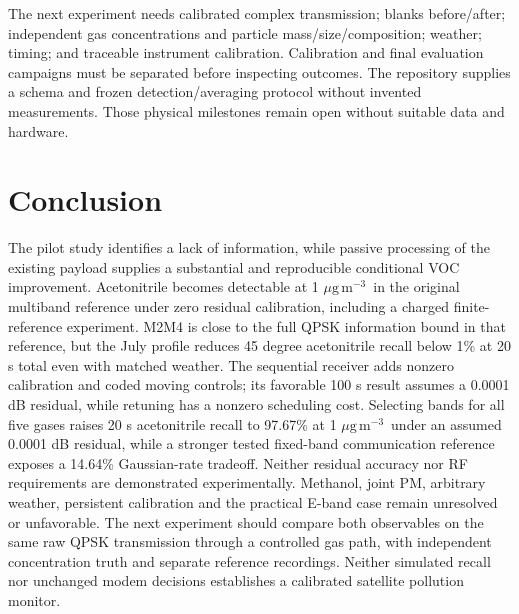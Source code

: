 \documentclass[conference]{IEEEtran}
\newcommand{\ugm}{\ensuremath{\mu\mathrm{g\,m}^{-3}}}
\begin{document}
The next experiment needs calibrated complex transmission; blanks before/after; independent gas concentrations and particle mass/size/composition; weather; timing; and traceable instrument calibration. Calibration and final evaluation campaigns must be separated before inspecting outcomes. The repository supplies a schema and frozen detection/averaging protocol without invented measurements. Those physical milestones remain open without suitable data and hardware.

\section{Conclusion}
The pilot study identifies a lack of information, while passive processing of the existing payload supplies a substantial and reproducible conditional VOC improvement. Acetonitrile becomes detectable at 1 \ugm\ in the original multiband reference under zero residual calibration, including a charged finite-reference experiment. M2M4 is close to the full QPSK information bound in that reference, but the July profile reduces 45 degree acetonitrile recall below 1\% at 20 s total even with matched weather. The sequential receiver adds nonzero calibration and coded moving controls; its favorable 100 s result assumes a 0.0001 dB residual, while retuning has a nonzero scheduling cost. Selecting bands for all five gases raises 20 s acetonitrile recall to 97.67\% at 1 \ugm\ under an assumed 0.0001 dB residual, while a stronger tested fixed-band communication reference exposes a 14.64\% Gaussian-rate tradeoff. Neither residual accuracy nor RF requirements are demonstrated experimentally. Methanol, joint PM, arbitrary weather, persistent calibration and the practical E-band case remain unresolved or unfavorable. The next experiment should compare both observables on the same raw QPSK transmission through a controlled gas path, with independent concentration truth and separate reference recordings. Neither simulated recall nor unchanged modem decisions establishes a calibrated satellite pollution monitor.
\end{document}
